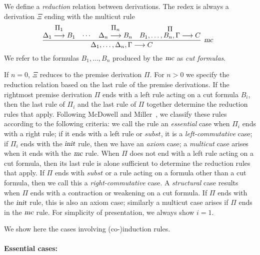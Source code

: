 \documentclass[preprint]{elsarticle}
\newcommand{\Seq}[2]{#1\longrightarrow #2}
\newcommand{\init}{\hbox{\sl init}}
\newcommand{\mc}{\hbox{\sl mc}}
\begin{document}
\begin{definition}
  \label{def:reduct}
  We define a \emph{reduction} relation between derivations.  The redex
  is always a derivation $\Xi$ ending with the multicut rule
  \begin{displaymath}
    \infer[\mc]{\Seq{\Delta_1,\ldots,\Delta_n,\Gamma}{C}}
    {\deduce{\Seq{\Delta_1}{B_1}}
      {\Pi_1}
      & \cdots
      & \deduce{\Seq{\Delta_n}{B_n}}
      {\Pi_n}
      & \deduce{\Seq{B_1,\ldots,B_n,\Gamma}{C}}
      {\Pi}}
    \enspace 
  \end{displaymath}
  We refer to the formulas $B_1,\dots,B_n$ produced by the $\mc$ as
  \emph{cut formulas}.

  If $n=0$, $\Xi$ reduces to the premise derivation $\Pi$.  For $n >
  0$ we specify the reduction relation based on the last rule of the
  premise derivations.  If the rightmost premise derivation $\Pi$ ends
  with a left rule acting on a cut formula $B_i$, then the last rule
  of $\Pi_i$ and the last rule of $\Pi$ together determine the
  reduction rules that apply.  Following McDowell and
  Miller~\cite{mcdowell00tcs}, we classify these rules according to
  the following criteria: we call the rule an \emph{essential} case
  when $\Pi_i$ ends with a right rule; if it ends with a left rule or $subst$, it
  is a \emph{left-commutative} case; if $\Pi_i$ ends with the $\init$
  rule, then we have an \emph{axiom} case; a \emph{multicut} case
  arises when it ends with the $\mc$ rule.  When $\Pi$ does not end
  with a left rule acting on a cut formula, then its last rule is
  alone sufficient to determine the reduction rules that apply.  If
  $\Pi$ ends with $subst$ or a rule acting on a formula other than a cut formula,
  then we call this a \emph{right-commutative} case.  A
  \emph{structural} case results when $\Pi$ ends with a contraction or
  weakening on a cut formula.  If $\Pi$ ends with the $\init$ rule,
  this is also an axiom case; similarly a multicut case arises if
  $\Pi$ ends in the $\mc$ rule.
  For simplicity of presentation, we always show $i = 1$.

  We show here  the cases involving (co-)induction rules. 

\paragraph{Essential cases:}

\begin{trivlist}


\end{trivlist}
\end{definition}
\end{document}
